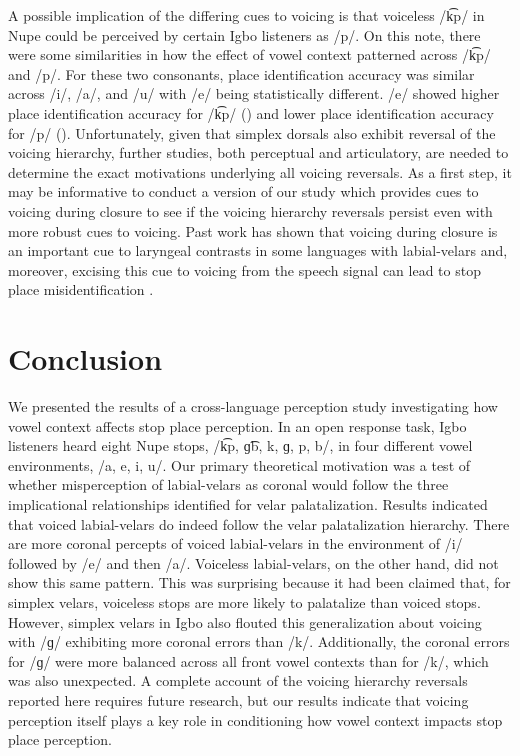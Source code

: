 \documentclass[output=paper,colorlinks,citecolor=brown
]{langscibook}
\begin{document}
A possible implication of the differing cues to voicing is that voiceless /k͡p/ in Nupe could be perceived by certain Igbo listeners as /p/. On this note, there were some similarities in how the effect of vowel context patterned across /k͡p/ and /p/. For these two consonants, place identification accuracy was similar across /i/, /a/, and /u/ with /e/ being statistically different. /e/ showed higher place identification accuracy for /k͡p/ () and lower place identification accuracy for /p/ (). Unfortunately, given that simplex dorsals also exhibit reversal of the voicing hierarchy, further studies, both perceptual and articulatory, are needed to determine the exact motivations underlying all voicing reversals. As a first step, it may be informative to conduct a version of our study which provides cues to voicing during closure to see if the voicing hierarchy reversals persist even with more robust cues to voicing. Past work has shown that voicing during closure is an important cue to laryngeal contrasts in some languages with labial-velars \citep{Grawunder2011} and, moreover, excising this cue to voicing from the speech signal can lead to stop place misidentification \citep{Cahill2006}.

\section{Conclusion}\label{sec:burnsshaw:Conclusion}
We presented the results of a cross-language perception study investigating how vowel context affects stop place perception. In an open response task, Igbo listeners heard eight Nupe stops, /k͡p, ɡ͡b, k, ɡ, p, b/, in four different vowel environments, /a, e, i, u/. Our primary theoretical motivation was a test of whether misperception of labial-velars as coronal would follow the three implicational relationships identified for velar palatalization. Results indicated that voiced labial-velars do indeed follow the velar palatalization hierarchy. There are more coronal percepts of voiced labial-velars in the environment of /i/ followed by /e/ and then /a/. Voiceless labial-velars, on the other hand, did not show this same pattern. This was surprising because it had been claimed that, for simplex velars, voiceless stops are more likely to palatalize than voiced stops. However, simplex velars in Igbo also flouted this generalization about voicing with /ɡ/ exhibiting more coronal errors than /k/. Additionally, the coronal errors for /ɡ/ were more balanced across all front vowel contexts than for /k/, which was also unexpected. A complete account of the voicing hierarchy reversals reported here requires future research, but our results indicate that voicing perception itself plays a key role in conditioning how vowel context impacts stop place perception.  

 
\sloppy 
\printbibliography[heading=subbibliography,notkeyword=this]
\end{document}
